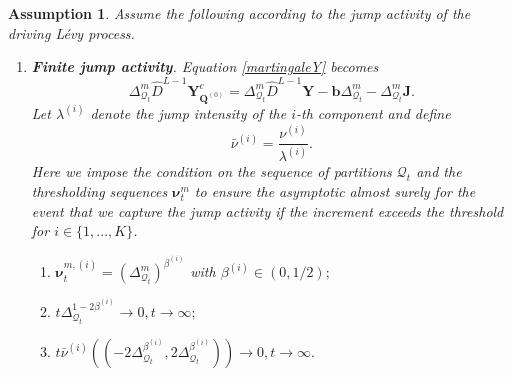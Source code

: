 \documentclass[12pt]{amsart}
\newtheorem{assumption}{Assumption}[section]
\numberwithin{equation}{section}
\newcommand{\1}{\mathbf{1}}
\begin{document}
\begin{assumption}
\label{assumptionB4}
Assume the following according to the jump activity of the driving L\'evy process.
\begin{enumerate}
    \item[(a)] \textbf{Finite jump activity}. \cite[4.3.1]{lucchese2026estimation}  
    Equation \eqref{martingaleY} becomes
    \begin{equation*}
\Delta^m_{\mathcal{Q}_t}\hat{D}^{L-1}\mathbf{Y}^c_{\mathbf{Q}^{(0)}}=\Delta^m_{\mathcal{Q}_t}\hat{D}^{L-1}\mathbf{Y}-\mathbf{b}\Delta^m_{\mathcal{Q}_t}-\Delta^m_{\mathcal{Q}_t}\mathbf{J}.
    \end{equation*}
    Let $\lambda^{(i)}$ denote the jump intensity of the $i$-th component and define
\begin{equation*}
\bar{\nu}^{(i)} = \frac{\nu^{(i)}}{\lambda^{(i)}}.
\end{equation*}
Here we impose the condition on the sequence of partitions $\mathcal{Q}_t$ and the thresholding sequences $\bm{\nu}_t^m$ to ensure the asymptotic almost surely for the event that we capture the jump activity if the increment exceeds the threshold for $i\in\{1,\dots,K\}$.
\begin{enumerate}
\item[(i)] $\bm{\nu}_t^{m,(i)}=\left(\Delta^m_{\mathcal{Q}_t}\right)^{\beta^{(i)}}$ with $\beta^{(i)}\in(0,1/2);$
\item[(ii)] $t\Delta_{\mathcal{Q}_t}^{1-2\beta^{(i)}}\to 0, t\to\infty;$
\item[(iii)] $t\bar{\nu}^{(i)}\left(\left(-2\Delta_{\mathcal{Q}_t}^{\beta^{(i)}},2\Delta_{\mathcal{Q}_t}^{\beta^{(i)}}\right)\right)\to 0, t\to\infty.$
\end{enumerate}


\end{enumerate}
\end{assumption}
\end{document}
